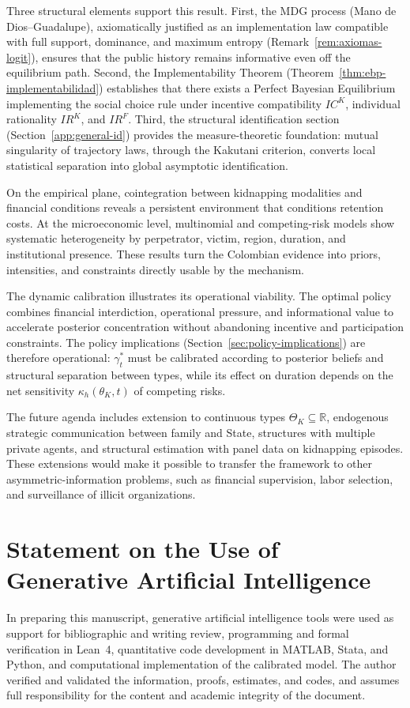 \documentclass[12pt,a4paper]{article}
\theoremstyle{plain}
\theoremstyle{definition}
\theoremstyle{remark}
\newcommand{\1}{\mathbf{1}}
\begin{document}
Three structural elements support this result. First, the MDG process (Mano de
Dios--Guadalupe), axiomatically justified as an implementation law compatible with full
support, dominance, and maximum entropy (Remark~\ref{rem:axiomas-logit}), ensures that
the public history remains informative even off the equilibrium path. Second, the
Implementability Theorem (Theorem~\ref{thm:ebp-implementabilidad}) establishes that
there exists a Perfect Bayesian Equilibrium implementing the social choice rule under
incentive compatibility $IC^K$, individual rationality $IR^K$, and $IR^F$. Third, the
structural identification section (Section~\ref{app:general-id}) provides the
measure-theoretic foundation: mutual singularity of trajectory laws, through the
Kakutani criterion, converts local statistical separation into global asymptotic
identification.

On the empirical plane, cointegration between kidnapping modalities and financial
conditions reveals a persistent environment that conditions retention costs. At the
microeconomic level, multinomial and competing-risk models show systematic
heterogeneity by perpetrator, victim, region, duration, and institutional presence.
These results turn the Colombian evidence into priors, intensities, and constraints
directly usable by the mechanism.

The dynamic calibration illustrates its operational viability. The optimal policy
combines financial interdiction, operational pressure, and informational value to
accelerate posterior concentration without abandoning incentive and participation
constraints. The policy implications (Section~\ref{sec:policy-implications}) are
therefore operational: $\gamma_t^\ast$ must be calibrated according to posterior beliefs
and structural separation between types, while its effect on duration depends on the net
sensitivity $\kappa_h(\theta_K,t)$ of competing risks.

The future agenda includes extension to continuous types
$\Theta_K\subseteq\mathbb{R}$, endogenous strategic communication between family and
State, structures with multiple private agents, and structural estimation with panel
data on kidnapping episodes. These extensions would make it possible to transfer the
framework to other asymmetric-information problems, such as financial supervision,
labor selection, and surveillance of illicit organizations.

\section*{Statement on the Use of Generative Artificial Intelligence}

In preparing this manuscript, generative artificial intelligence tools were used as
support for bibliographic and writing review, programming and formal verification in
Lean~4, quantitative code development in MATLAB, Stata, and Python, and computational
implementation of the calibrated model. The author verified and validated the
information, proofs, estimates, and codes, and assumes full responsibility for the
content and academic integrity of the document.


\end{document}
